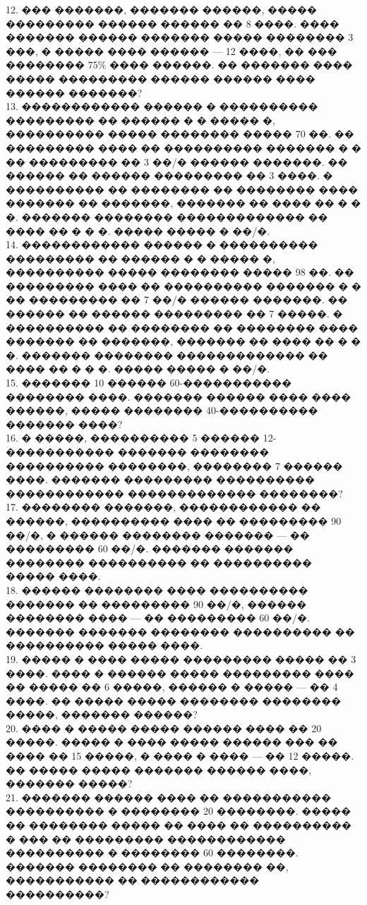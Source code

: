 \documentclass[12pt]{article}
\begin{document}
12. ��� �������, ������� ������, ����� ��������� ������ ������ �� 8 ����. ���� ������� ������ ������� ����� �������� 3 ���, � ����� ���� ������ --- 12 ����, �� ��� �������� $75\%$ ���� ������. �� ������� ���� ����� ��������� ������ ������ ���� ������ �������?\\
13. ������������ ������ � ���������� ��������� �� ������ � � ����� �, ���������� ����� �������� ����� 70 ��. �� ��������� ���� �� ���������� ������� � � �� ��������� �� 3 ��/� ������ �������. �� ������ �� ������ ��������� �� 3 ����. � ���������� �� �������� �� �������� ���� ������� �� �������, ������� �� ���� �� � � �. ������� �������� ������������� �� ���� �� � � �. ����� ����� � ��/�.\\
14. ������������ ������ � ���������� ��������� �� ������ � � ����� �, ���������� ����� �������� ����� 98 ��. �� ��������� ���� �� ���������� ������� � � �� ��������� �� 7 ��/� ������ �������. �� ������ �� ������ ��������� �� 7 �����. � ���������� �� �������� �� �������� ���� ������� �� �������, ������� �� ���� �� � � �. ������� �������� ������������� �� ���� �� � � �. ����� ����� � ��/�.\\
15. ������� 10 ������ 60-����������� �������� ����. ������� ������ ���� ���� ������, ����� �������� 40-���������� ������� ����?\\
16. � �����, ���������� 5 ������ 12-����������� ������� �������� ���������� ��������, �������� 7 ������ ����. ������� ��������� ���������� ������������ ������������� ��������?\\
17. �������� �������, ������������ �� ������, ���������� ���� �� ��������� 90 ��/�, � ������ �������� ������� --- �� ��������� 60 ��/�. ������� ������� �������� ���������� �� ���������� ����� ����.\\
18. ������ �������� ���� ���������� ������� �� ��������� 90 ��/�, ������ �������� ���� --- �� ��������� 60 ��/�. ������� ������� �������� ���������� �� ���������� ����� ����.\\
19. ����� � ���� ����� ��������� ����� �� 3 ����. ���� � ������ ����� ��������� ���� �� ����� �� 6 �����, ������ � ����� --- �� 4 ����. �� ����� ����� �������� �������� �����, ������� ������?\\
20. ���� � ����� ����� ������ ���� �� 20 �����. ����� � ���� ����� ������ ��� �� ���� �� 15 �����, � ���� � ���� --- �� 12 �����. �� ����� ����� ������� ������ ����, ������� �����?\\
21. ������� ������ ���� �� ����������� ���������� � �������� 20 ��������. ����� �� �������� ����� �� ���� �� ���������� � ��� �� ��������� ������������ ���������� � �������� 60 ��������. ������� �������� �� �������� ��, ����������� �� ������������ ����������?\\
\end{document}
